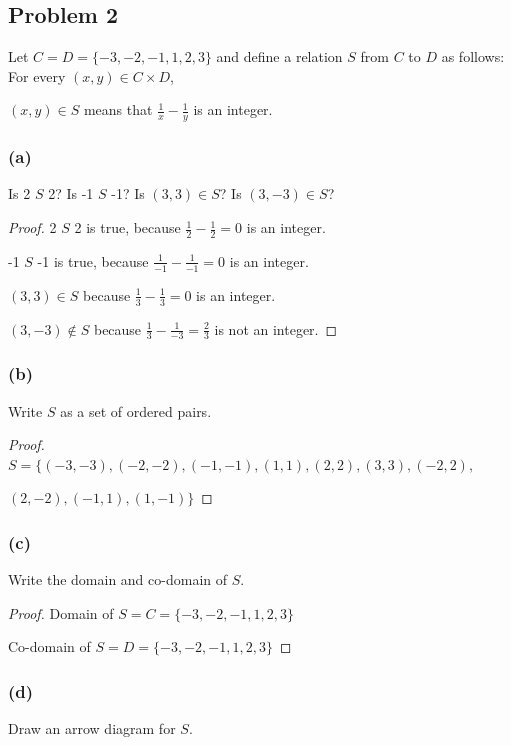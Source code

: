 \documentclass[14pt]{extarticle}
\newcommand{\dps}{\displaystyle}
\begin{document}
\subsection{Problem 2}
Let $C = D = \{-3, -2, -1, 1, 2, 3\}$ and define a relation $S$ from $C$ to
$D$ as follows: For every $(x, y) \in C \times D$,

\begin{center}
$(x, y) \in S$ means that $\dps \frac{1}{x} - \frac{1}{y}$ is an integer.
\end{center}

\subsubsection{(a)}
Is 2 $S$ 2? Is -1 $S$ -1? Is $(3, 3) \in S$? Is $(3, -3) \in S$?

\begin{proof}
2 $S$ 2 is true, because $\dps \frac{1}{2} - \frac{1}{2} = 0$ is an integer.

-1 $S$ -1 is true, because $\dps \frac{1}{-1} - \frac{1}{-1} = 0$ is an integer.

$(3, 3) \in S$ because $\dps \frac{1}{3} - \frac{1}{3} = 0$ is an integer.

$(3, -3) \notin S$ because $\dps \frac{1}{3} - \frac{1}{-3} = \frac{2}{3}$
is not an integer.
\end{proof}

\subsubsection{(b)}
Write $S$ as a set of ordered pairs.

\begin{proof}
$S = \{(-3, -3), (-2, -2), (-1, -1), (1, 1), (2, 2), (3, 3), (-2, 2),$

$(2, -2), (-1, 1), (1, -1)\}$
\end{proof}

\subsubsection{(c)}
Write the domain and co-domain of $S$.

\begin{proof}
Domain of $S = C = \{-3, -2, -1, 1, 2, 3\}$

Co-domain of $S = D = \{-3, -2, -1, 1, 2, 3\}$
\end{proof}

\subsubsection{(d)}
Draw an arrow diagram for $S$.
\end{document}
